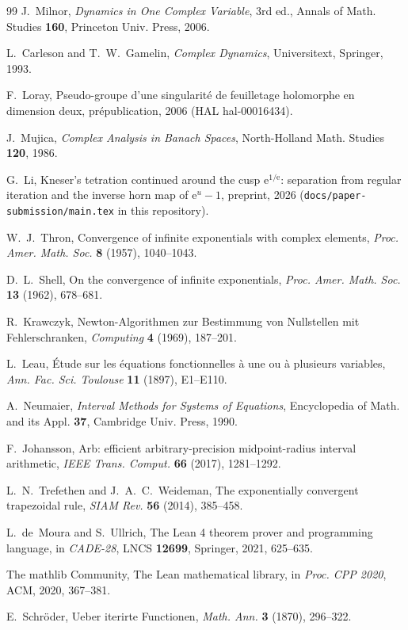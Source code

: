 \begin{thebibliography}{99}
J.~Milnor, \emph{Dynamics in One Complex Variable}, 3rd ed.,
Annals of Math. Studies \textbf{160}, Princeton Univ. Press, 2006.

L.~Carleson and T.~W.~Gamelin, \emph{Complex Dynamics}, Universitext, Springer, 1993.

F.~Loray, Pseudo-groupe d'une singularit\'e de feuilletage holomorphe en dimension deux,
pr\'epublication, 2006 (HAL hal-00016434).

J.~Mujica, \emph{Complex Analysis in Banach Spaces}, North-Holland Math. Studies \textbf{120}, 1986.

G.~Li, Kneser's tetration continued around the cusp $\mathrm e^{1/\mathrm e}$:
separation from regular iteration and the inverse horn map of $\mathrm e^u-1$,
preprint, 2026 (\texttt{docs/paper-submission/main.tex} in this repository).


W.~J.~Thron, Convergence of infinite exponentials with complex elements,
\emph{Proc. Amer. Math. Soc.} \textbf{8} (1957), 1040--1043.

D.~L.~Shell, On the convergence of infinite exponentials,
\emph{Proc. Amer. Math. Soc.} \textbf{13} (1962), 678--681.

R.~Krawczyk, Newton-Algorithmen zur Bestimmung von Nullstellen mit Fehlerschranken,
\emph{Computing} \textbf{4} (1969), 187--201.

L.~Leau, \'Etude sur les \'equations fonctionnelles \`a une ou \`a plusieurs variables,
\emph{Ann. Fac. Sci. Toulouse} \textbf{11} (1897), E1--E110.


A.~Neumaier, \emph{Interval Methods for Systems of Equations},
Encyclopedia of Math. and its Appl. \textbf{37}, Cambridge Univ. Press, 1990.

F.~Johansson, Arb: efficient arbitrary-precision midpoint-radius interval arithmetic,
\emph{IEEE Trans. Comput.} \textbf{66} (2017), 1281--1292.

L.~N.~Trefethen and J.~A.~C.~Weideman, The exponentially convergent trapezoidal rule,
\emph{SIAM Rev.} \textbf{56} (2014), 385--458.

L.~de~Moura and S.~Ullrich, The Lean 4 theorem prover and programming language,
in \emph{CADE-28}, LNCS \textbf{12699}, Springer, 2021, 625--635.

The mathlib Community, The Lean mathematical library,
in \emph{Proc. CPP 2020}, ACM, 2020, 367--381.

E.~Schr\"oder, Ueber iterirte Functionen, \emph{Math. Ann.} \textbf{3} (1870), 296--322.

\end{thebibliography}
